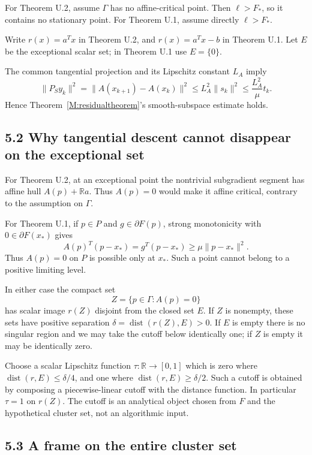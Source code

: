 For Theorem U.2, assume \(\Gamma\) has no affine-critical point. Then
\(\ell>F_*\), so it contains no stationary point. For Theorem U.1, assume
directly \(\ell>F_*\).

Write \(r(x)=a^Tx\) in Theorem U.2, and \(r(x)=a^Tx-b\) in Theorem U.1. Let
\(E\) be the exceptional scalar set; in Theorem U.1 use \(E=\{0\}\).

The common tangential projection and its Lipschitz constant \(L_A\)
imply \[
 \|P_S y_k\|^2=\|A(x_{k+1})-A(x_k)\|^2
 \le L_A^2\|s_k\|^2\le\frac{L_A^2}{\mu}t_k.\tag{U.11}
\] Hence Theorem~\ref{M:residualtheorem}'s smooth-subspace estimate holds.

\subsection{5.2 Why tangential descent cannot disappear on the
exceptional
set}\label{U:why-tangential-descent-cannot-disappear-on-the-exceptional-set}

For Theorem U.2, at an exceptional point the nontrivial subgradient
segment has affine hull \(A(p)+\mathbb R a\). Thus \(A(p)=0\) would make
it affine critical, contrary to the assumption on \(\Gamma\).

For Theorem U.1, if \(p\in P\) and \(g\in\partial F(p)\), strong
monotonicity with \(0\in\partial F(x_*)\) gives \[
 A(p)^T(p-x_*)=g^T(p-x_*)\ge\mu\|p-x_*\|^2.
\] Thus \(A(p)=0\) on \(P\) is possible only at \(x_*\). Such a point
cannot belong to a positive limiting level.

In either case the compact set \[
 Z=\{p\in\Gamma:A(p)=0\}
\] has scalar image \(r(Z)\) disjoint from the closed set \(E\). If
\(Z\) is nonempty, these sets have positive separation
\(\delta=\operatorname{dist}(r(Z),E)>0\). If \(E\) is empty there is no
singular region and we may take the cutoff below identically one; if
\(Z\) is empty it may be identically zero.

Choose a scalar Lipschitz function \(\tau:\mathbb R\to[0,1]\) which is
zero where \(\operatorname{dist}(r,E)\le\delta/4\), and one where
\(\operatorname{dist}(r,E)\ge\delta/2\). Such a cutoff is obtained by
composing a piecewise-linear cutoff with the distance function. In
particular \(\tau=1\) on \(r(Z)\). The cutoff is an analytical object
chosen from \(F\) and the hypothetical cluster set, not an algorithmic
input.

\subsection{5.3 A frame on the entire cluster
set}\label{U:a-frame-on-the-entire-cluster-set}

